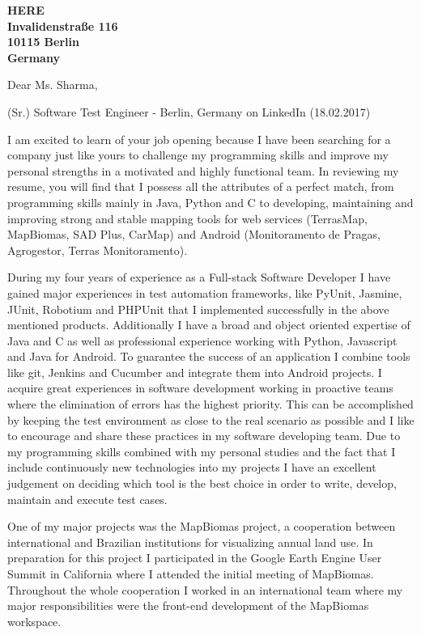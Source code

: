 \documentclass[a4paper]{joaosoares-letter}
\begin{document}
\longindentation=0pt

\begin{letter}{\bfseries HERE\\Invalidenstraße 116\\10115 Berlin\\Germany}


\date{Belém, \today}

\opening{Dear Ms. Sharma,}{(Sr.) Software Test Engineer - Berlin, Germany on LinkedIn (18.02.2017)}

I am excited to learn of your job opening because I have been searching for a company just like yours to challenge my programming skills and improve my personal strengths in a motivated and highly functional team. In reviewing my resume, you will find that I possess all the attributes of a perfect match, from programming skills mainly in Java, Python and C to developing, maintaining and improving strong and stable mapping tools for web services (TerrasMap, MapBiomas, SAD Plus, CarMap) and Android (Monitoramento de Pragas, Agrogestor, Terras Monitoramento).

During my four years of experience as a Full-stack Software Developer I have gained major experiences in test automation frameworks, like PyUnit, Jasmine, JUnit, Robotium and PHPUnit that I implemented successfully in the above mentioned products. Additionally I have a broad and object oriented expertise of Java and C as well as professional experience working with Python, Javascript and Java for Android. To guarantee the success of an application I combine tools like git, Jenkins and Cucumber and integrate them into Android projects. I acquire great experiences in software development working in proactive teams where the elimination of errors has the highest priority. This can be accomplished by keeping the test environment as close to the real scenario as possible and I like to encourage and share these practices in my software developing team. Due to my programming skills combined with my personal studies and the fact that I include continuously new technologies into my projects I have an excellent judgement on deciding which tool is the best choice in order to write, develop, maintain and execute test cases.

One of my major projects was the MapBiomas project, a cooperation between international and Brazilian institutions for visualizing annual land use. In preparation for this project I participated in the Google Earth Engine User Summit in California where I attended the initial meeting of MapBiomas. Throughout the whole cooperation I worked in an international team where my major responsibilities were the front-end development of the MapBiomas workspace.


\end{letter}
\end{document}
